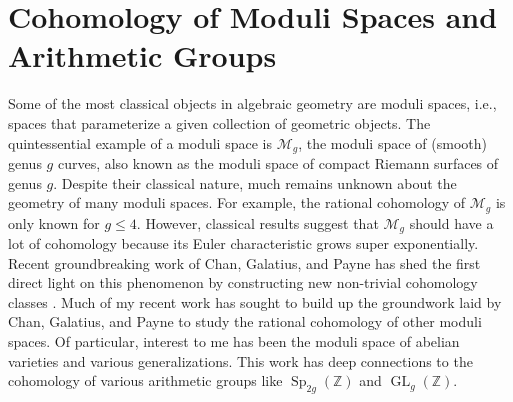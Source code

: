 \documentclass[11pt,reqno]{amsart}
\newtheorem{theorem}[lemma]{Theorem}
\theoremstyle{remark}
\newcommand{\GL}{{\operatorname{GL}}}
\newcommand{\Sp}{\operatorname{Sp}}
\newcommand{\cM}{\mathcal{M}}
\newcommand{\Q}{\mathbb{Q}}
\newcommand{\Z}{\mathbb{Z}}
\begin{document}
\section{Cohomology of Moduli Spaces and Arithmetic Groups}

Some of the most classical objects in algebraic geometry are moduli spaces, i.e., spaces that parameterize a given collection of geometric objects. The quintessential example of a moduli space is $\cM_{g}$, the moduli space of (smooth) genus $g$ curves, also known as the moduli space of compact Riemann surfaces of genus $g$. Despite their classical nature, much remains unknown about the geometry of many moduli spaces. For example, the rational cohomology of $\cM_{g}$ is only known for $g\leq 4$. However, classical results suggest that $\cM_{g}$ should have a lot of cohomology because its Euler characteristic grows super exponentially. Recent groundbreaking work of Chan, Galatius, and Payne has shed the first direct light on this phenomenon by constructing new non-trivial cohomology classes \cite{CGP21}. Much of my recent work has sought to build up the groundwork laid by Chan, Galatius, and Payne to study the rational cohomology of other moduli spaces. Of particular, interest to me has been the moduli space of abelian varieties and various generalizations. This work has deep connections to the cohomology of various arithmetic groups like $\Sp_{2g}(\Z)$ and  $\GL_{g}(\Z)$. 






\end{document}
